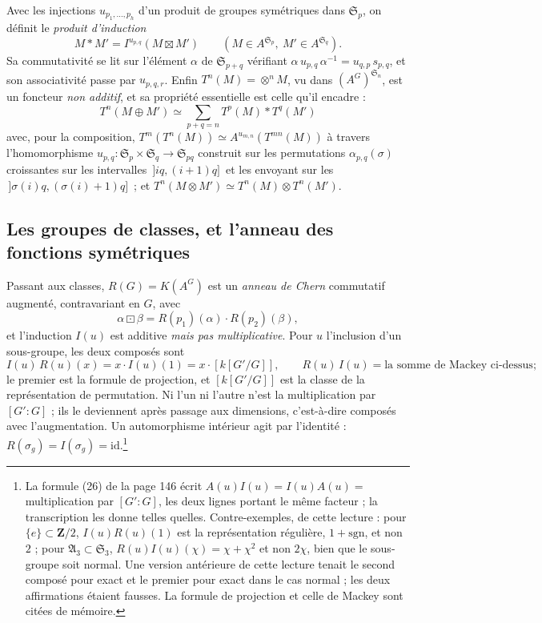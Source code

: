 \documentclass[11pt,a4paper]{article}
\begin{document}
Avec les injections $u_{p_{1},\ldots,p_{h}}$ d'un produit de groupes
symétriques dans $\mathfrak{S}_{p}$, on définit le \emph{produit d'induction}
\[
M * M' = I^{u_{p,q}}(M \boxtimes M')
\qquad
(M \in A^{\mathfrak{S}_{p}} , \ M' \in A^{\mathfrak{S}_{q}}) .
\]
Sa commutativité se lit sur l'élément $\alpha$ de $\mathfrak{S}_{p+q}$
vérifiant $\alpha\,u_{p,q}\,\alpha^{-1} = u_{q,p}\,s_{p,q}$, et son
associativité passe par $u_{p,q,r}$. Enfin $T^{n}(M) = \otimes^{n}M$, vu dans
$(A^{G})^{\mathfrak{S}_{n}}$, est un foncteur \emph{non additif}, et sa
propriété essentielle est celle qu'il encadre :
\[
\boxed{\ T^{n}(M \oplus M') \simeq \sum_{p+q=n} T^{p}(M) * T^{q}(M')\ }
\]
avec, pour la composition, $T^{m}(T^{n}(M)) \simeq
A^{u_{m,n}}(T^{mn}(M))$ à travers l'homomorphisme
$u_{p,q} \colon \mathfrak{S}_{p} \times \mathfrak{S}_{q} \to
\mathfrak{S}_{pq}$ construit sur les permutations $\alpha_{p,q}(\sigma)$
croissantes sur les intervalles $\,]iq, (i+1)q]\,$ et les envoyant sur les
$\,]\sigma(i)q, (\sigma(i)+1)q]\,$ ; et
$T^{n}(M \otimes M') \simeq T^{n}(M) \otimes T^{n}(M')$.

\subsection*{Les groupes de classes, et l'anneau des fonctions symétriques}

Passant aux classes, $R(G) = K(A^{G})$ est un \emph{anneau de Chern}
commutatif augmenté, contravariant en $G$, avec
\[
\alpha \boxdot \beta = R(p_{1})(\alpha) \cdot R(p_{2})(\beta) ,
\]
et l'induction $I(u)$ est additive \emph{mais pas multiplicative}. Pour $u$
l'inclusion d'un sous-groupe, les deux composés sont
\[
I(u)\,R(u)(x) = x \cdot I(u)(1) = x \cdot [k[G'/G]] ,
\qquad
R(u)\,I(u) = \text{la somme de Mackey ci-dessus} ;
\]
le premier est la formule de projection, et $[k[G'/G]]$ est la classe de la
représentation de permutation. Ni l'un ni l'autre n'est la multiplication par
$[G':G]$ ; ils le deviennent après passage aux dimensions, c'est-à-dire
composés avec l'augmentation. Un automorphisme intérieur agit par l'identité :
$R(\sigma_{g}) = I(\sigma_{g}) = \mathrm{id}$.\footnote{La formule (26) de la
page 146 écrit $A(u)I(u) = I(u)A(u) = $ multiplication par $[G':G]$, les deux
lignes portant le même facteur ; la transcription les donne telles quelles.
Contre-exemples, de cette lecture : pour $\{e\} \subset \mathbf{Z}/2$,
$I(u)R(u)(1)$ est la représentation régulière, $1 + \mathrm{sgn}$, et non
$2$ ; pour $\mathfrak{A}_{3} \subset \mathfrak{S}_{3}$, $R(u)I(u)(\chi) = \chi
+ \chi^{2}$ et non $2\chi$, bien que le sous-groupe soit normal. Une version
antérieure de cette lecture tenait le second composé pour exact et le premier
pour exact dans le cas normal ; les deux affirmations étaient fausses. La
formule de projection et celle de Mackey sont citées de mémoire.}
\end{document}
